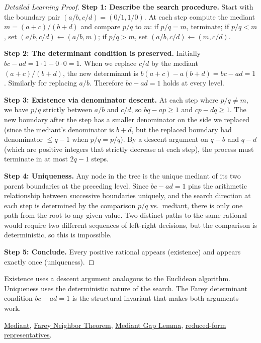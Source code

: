 \begin{proof}[Detailed Learning Proof]
\LRAProofBodyStart
\textbf{Step 1: Describe the search procedure.}
Start with the boundary pair $(a/b, c/d) = (0/1, 1/0)$.
At each step compute the mediant $m = (a+c)/(b+d)$ and compare $p/q$ to $m$:
if $p/q = m$, terminate; if $p/q < m$, set $(a/b, c/d) \leftarrow (a/b, m)$;
if $p/q > m$, set $(a/b, c/d) \leftarrow (m, c/d)$.

\textbf{Step 2: The determinant condition is preserved.}
Initially $bc - ad = 1 \cdot 1 - 0 \cdot 0 = 1$.  When we replace
$c/d$ by the mediant $(a+c)/(b+d)$, the new determinant is
$b(a+c) - a(b+d) = bc - ad = 1$.  Similarly for replacing $a/b$.
Therefore $bc - ad = 1$ holds at every level.

\textbf{Step 3: Existence via denominator descent.}
At each step where $p/q \neq m$, we have $p/q$ strictly between $a/b$
and $c/d$, so $bq - ap \geq 1$ and $cp - dq \geq 1$.
The new boundary after the step has a smaller denominator on the side
we replaced (since the mediant's denominator is $b + d$, but the
replaced boundary had denominator $\leq q - 1$ when $p/q = p/q$).
By a descent argument on $q - b$ and $q - d$ (which are positive integers
that strictly decrease at each step), the process must terminate in at
most $2q - 1$ steps.

\textbf{Step 4: Uniqueness.}
Any node in the tree is the unique mediant of its two parent boundaries
at the preceding level.  Since $bc - ad = 1$ pins the arithmetic
relationship between successive boundaries uniquely, and the search
direction at each step is determined by the comparison $p/q$ vs.\ mediant,
there is only one path from the root to any given value.  Two distinct
paths to the same rational would require two different sequences of
left-right decisions, but the comparison is deterministic, so this is
impossible.

\textbf{Step 5: Conclude.}
Every positive rational appears (existence) and appears exactly once
(uniqueness).
\end{proof}

\begin{remark*}
Existence uses a descent argument analogous to the Euclidean algorithm.
Uniqueness uses the deterministic nature of the search.  The Farey
determinant condition $bc - ad = 1$ is the structural invariant that
makes both arguments work.
\end{remark*}

\begin{dependencies}
\hyperref[def:mediant]{Mediant},
\hyperref[thm:farey-neighbor-theorem]{Farey Neighbor Theorem},
\hyperref[lem:mediant-gap]{Mediant Gap Lemma},
\hyperref[thm:fraction-pair-equivalence]{reduced-form representatives}.
\end{dependencies}

\clearpage
